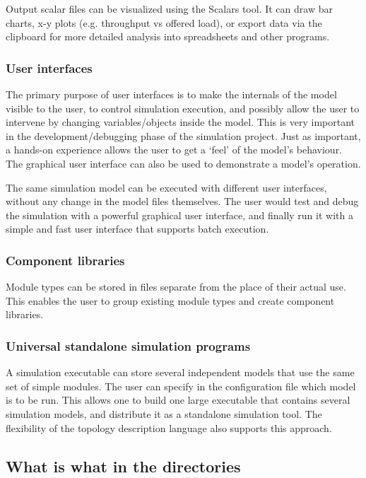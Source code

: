 Output scalar files can be visualized using the Scalars tool.
It can draw bar charts, x-y plots (e.g. throughput vs offered load),
or export data via the clipboard for more detailed analysis into
spreadsheets and other programs.


\subsubsection{User interfaces}

The primary purpose of user interfaces is to make the internals
of the model visible to the user, to control simulation execution,
and possibly allow the user to intervene by changing variables/objects
inside the model. This is very important in the development/debugging
phase of the simulation project. Just as important, a hands-on
experience allows the user to get a `feel' of the model's
behaviour. The graphical user interface can also be used to
demonstrate a model's operation.


The same simulation model can be executed with different user
interfaces, without any change in the model files themselves.
The user would test and debug the simulation with a powerful
graphical user interface, and finally run it with a simple and
fast user interface that supports batch execution.


\subsubsection{Component libraries}

Module types can be stored in files separate from the place
of their actual use. This enables the user to group existing
module types and create component libraries.


\subsubsection{Universal standalone simulation programs}


A simulation executable can store several independent models
that use the same set of simple modules. The user can specify
in the configuration file which model is to be run. This
allows one to build one large executable that contains several
simulation models, and distribute it as a standalone simulation
tool. The flexibility of the topology description language also
supports this approach.


\subsection{What is what in the directories}

